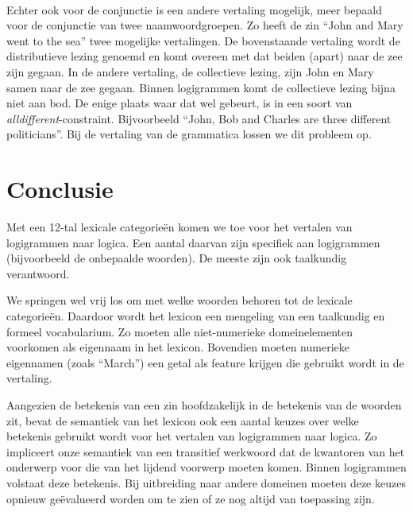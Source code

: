 \paragraph{} Echter ook voor de conjunctie is een andere vertaling mogelijk, meer bepaald voor de conjunctie van twee naamwoordgroepen. Zo heeft de zin ``John and Mary went to the sea'' twee mogelijke vertalingen. De bovenstaande vertaling wordt de distributieve lezing genoemd en komt overeen met dat beiden (apart) naar de zee zijn gegaan. In de andere vertaling, de collectieve lezing, zijn John en Mary samen naar de zee gegaan. Binnen logigrammen komt de collectieve lezing bijna niet aan bod. De enige plaats waar dat wel gebeurt, is in een soort van \textit{alldifferent}-constraint. Bijvoorbeeld ``John, Bob and Charles are three different politicians''. Bij de vertaling van de grammatica lossen we dit probleem op.

\section{Conclusie}
Met een 12-tal lexicale categorieën komen we toe voor het vertalen van logigrammen naar logica. Een aantal daarvan zijn specifiek aan logigrammen (bijvoorbeeld de onbepaalde woorden). De meeste zijn ook taalkundig verantwoord.

We springen wel vrij los om met welke woorden behoren tot de lexicale categorieën. Daardoor wordt het lexicon een mengeling van een taalkundig en formeel vocabularium. Zo moeten alle niet-numerieke domeinelementen voorkomen als eigennaam in het lexicon. Bovendien moeten numerieke eigennamen (zoals ``March'') een getal als feature krijgen die gebruikt wordt in de vertaling.

Aangezien de betekenis van een zin hoofdzakelijk in de betekenis van de woorden zit, bevat de semantiek van het lexicon ook een aantal keuzes over welke betekenis gebruikt wordt voor het vertalen van logigrammen naar logica. Zo impliceert onze semantiek van een transitief werkwoord dat de kwantoren van het onderwerp voor die van het lijdend voorwerp moeten komen. Binnen logigrammen volstaat deze betekenis. Bij uitbreiding naar andere domeinen moeten deze keuzes opnieuw geëvalueerd worden om te zien of ze nog altijd van toepassing zijn.

